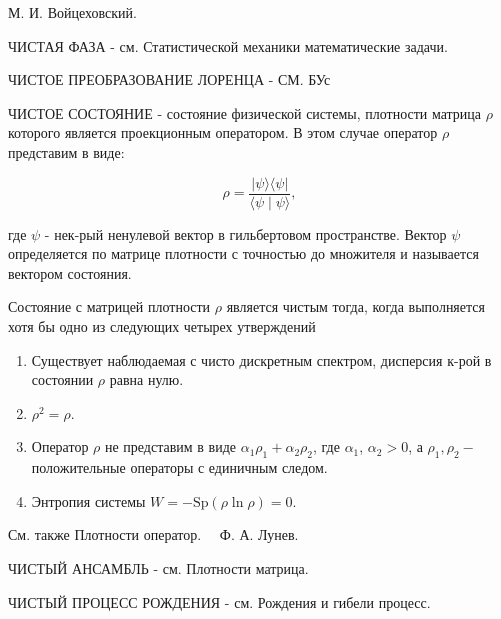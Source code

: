 \documentclass[10pt]{article}
\begin{document}
М. И. Войцеховский.



ЧИСТАЯ ФАЗА - см. Статистической механики математические задачи.



ЧИСТОЕ ПРЕОБРАЗОВАНИЕ ЛОРЕНЦА - СМ. БУс



ЧИСТОЕ СОСТОЯНИЕ - состояние физической системы, плотности матрица $\rho$ которого является проекционным оператором. В этом случае оператор $\rho$ представим в виде:



\[

\rho=\frac{|\psi\rangle\langle\psi|}{\langle\psi \mid \psi\rangle},

\]



где $\psi$ - нек-рый ненулевой вектор в гильбертовом пространстве. Вектор $\psi$ определяется по матрице плотности с точностью до множителя и называется вектором состояния.



Состояние с матрицей плотности $\rho$ является чистым тогда, когда выполняется хотя бы одно из следующих четырех утверждений



\begin{enumerate}

  \item Существует наблюдаемая с чисто дискретным спектром, дисперсия к-рой в состоянии $\rho$ равна нулю.



  \item $\rho^{2}=\rho$.



  \item Оператор $\rho$ не представим в виде $\alpha_{1} \rho_{1}+\alpha_{2} \rho_{2}$, где $\alpha_{1}$, $\alpha_{2}>0$, а $\rho_{1}, \rho_{2}-$ положительные операторы с единичным следом.



  \item Энтропия системы $W=-\mathrm{Sp}(\rho \ln \rho)=0$.



\end{enumerate}



См. также Плотности оператор. $\quad Ф$. А. Лунев.



ЧИСТЫЙ АНСАМБЛЬ - см. Плотности матрица.



ЧИСТЫЙ ПРОЦЕСС РОЖДЕНИЯ - см. Рождения и гибели процесс.
\end{document}
